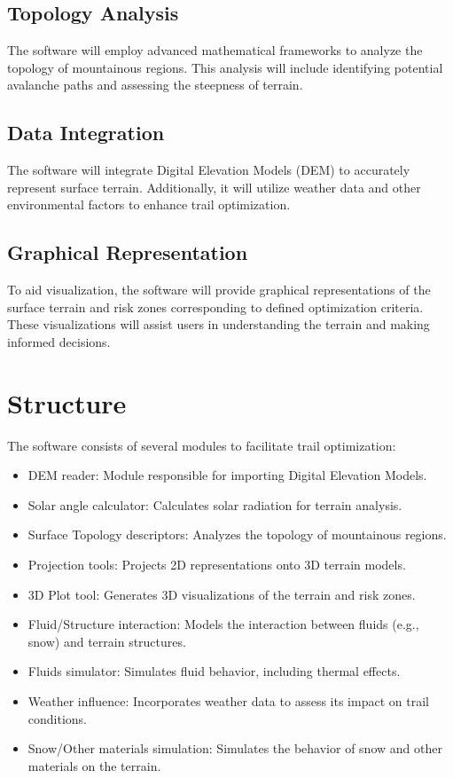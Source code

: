 \documentclass{article}
\begin{document}
\subsection{Topology Analysis}
The software will employ advanced mathematical frameworks to analyze the topology of mountainous regions. This analysis will include identifying potential avalanche paths and assessing the steepness of terrain.

\subsection{Data Integration}
The software will integrate Digital Elevation Models (DEM) to accurately represent surface terrain. Additionally, it will utilize weather data and other environmental factors to enhance trail optimization.

\subsection{Graphical Representation}
To aid visualization, the software will provide graphical representations of the surface terrain and risk zones corresponding to defined optimization criteria. These visualizations will assist users in understanding the terrain and making informed decisions.

\section{Structure}
The software consists of several modules to facilitate trail optimization:
\begin{itemize}
    \item DEM reader: Module responsible for importing Digital Elevation Models.
    \item Solar angle calculator: Calculates solar radiation for terrain analysis.
    \item Surface Topology descriptors: Analyzes the topology of mountainous regions.
    \item Projection tools: Projects 2D representations onto 3D terrain models.
    \item 3D Plot tool: Generates 3D visualizations of the terrain and risk zones.
    \item Fluid/Structure interaction: Models the interaction between fluids (e.g., snow) and terrain structures.
    \item Fluids simulator: Simulates fluid behavior, including thermal effects.
    \item Weather influence: Incorporates weather data to assess its impact on trail conditions.
    \item Snow/Other materials simulation: Simulates the behavior of snow and other materials on the terrain.
\end{itemize}
\end{document}
